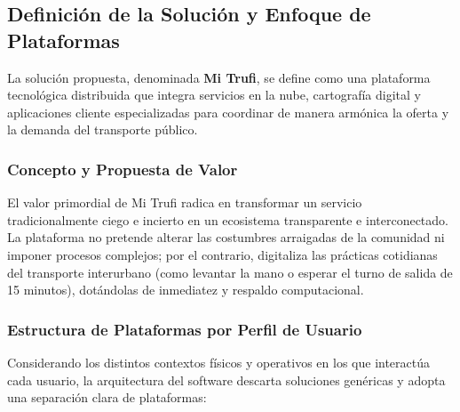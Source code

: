 \subsection{Definición de la Solución y Enfoque de Plataformas}

La solución propuesta, denominada \textbf{Mi Trufi}, se define como una plataforma tecnológica distribuida que integra servicios en la nube, cartografía digital y aplicaciones cliente especializadas para coordinar de manera armónica la oferta y la demanda del transporte público.

\subsubsection{Concepto y Propuesta de Valor}

El valor primordial de Mi Trufi radica en transformar un servicio tradicionalmente ciego e incierto en un ecosistema transparente e interconectado. La plataforma no pretende alterar las costumbres arraigadas de la comunidad ni imponer procesos complejos; por el contrario, digitaliza las prácticas cotidianas del transporte interurbano (como levantar la mano o esperar el turno de salida de 15 minutos), dotándolas de inmediatez y respaldo computacional.

\subsubsection{Estructura de Plataformas por Perfil de Usuario}

Considerando los distintos contextos físicos y operativos en los que interactúa cada usuario, la arquitectura del software descarta soluciones genéricas y adopta una separación clara de plataformas:

